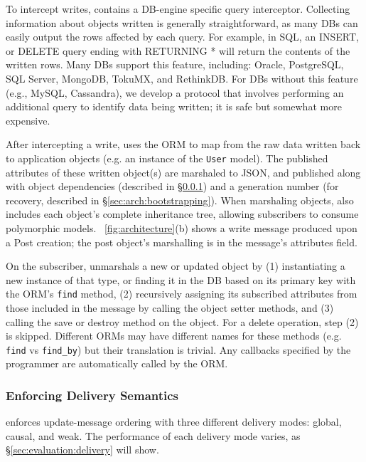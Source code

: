 To intercept writes, \synapse contains a DB-engine specific query interceptor.
Collecting information about objects written is
generally straightforward, as many DBs can easily output the rows affected
by each query. For example, in SQL, an {\code INSERT}, or {\code DELETE}
query ending with {\code RETURNING *} will return the contents of the
written rows. Many DBs support this feature, including: Oracle, PostgreSQL, SQL
Server, MongoDB, TokuMX, and RethinkDB. For DBs without this feature
(e.g., MySQL, Cassandra), we develop a protocol that involves performing an additional
query to identify data being written; it is safe but somewhat more expensive.

After intercepting a write, \synapse uses the ORM to map from the raw data
written back to application objects (e.g. an instance of the {\tt User} model).
The published attributes of these written object(s) are marshaled to JSON, and published
along with object dependencies (described in
\S\ref{sec:arch:cross-db-causality}) and a generation number (for recovery,
described in \S\ref{sec:arch:bootstrapping}). When marshaling objects,
\synapse also includes each object's complete inheritance tree, allowing
subscribers to consume polymorphic models.
\F~\ref{fig:architecture}(b) shows a write message produced
upon a {\code Post} creation; the post object's marshalling is in the message's
{\code attributes} field.

On the subscriber, \synapse unmarshals a new or updated object by (1)
instantiating a new instance of that type, or finding it in the DB based on its primary key with
the ORM's {\tt find} method, (2) recursively assigning its
subscribed attributes from those included in the message by calling the
object setter methods, and (3) calling the {\code save} or {\code
destroy} method on the object. For a delete operation, step (2) is skipped.
Different ORMs may have different names for these methods (e.g. {\tt find} vs
{\tt find\_by}) but their translation is trivial. Any callbacks specified by the
programmer are automatically called by the ORM.

\subsubsection{Enforcing Delivery Semantics} \label{sec:arch:cross-db-causality}

\synapse enforces update-message ordering with three different
delivery modes: global, causal, and weak. The performance of each delivery mode
varies, as \S\ref{sec:evaluation:delivery} will show.

